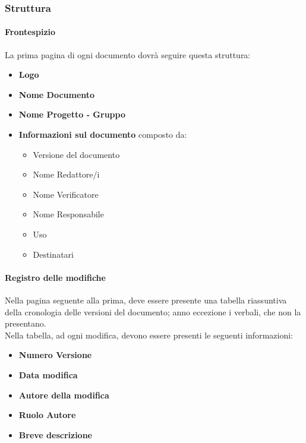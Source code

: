 \documentclass[11pt,a4paper]{article}
\begin{document}
{	\subsubsection{Struttura}
	
	\paragraph{Frontespizio\\} 
	La prima pagina di ogni documento dovrà seguire questa struttura:
	\begin{itemize}
		\item \textbf{Logo}
		\item \textbf{Nome Documento}
		\item \textbf{Nome Progetto - Gruppo}
		\item \textbf{Informazioni sul documento} composto da:
		\begin{itemize}
			\item  Versione del documento 
			\item Nome Redattore/i
			\item Nome Verificatore
			\item  Nome Responsabile
			\item  Uso
			\item Destinatari
		\end{itemize}
	\end{itemize}
	
	\paragraph{Registro delle modifiche\\}
	Nella pagina seguente alla prima, deve essere presente una tabella riassuntiva della cronologia delle versioni del documento; anno eccezione i verbali, che non la presentano. \\
	Nella tabella, ad ogni modifica, devono essere presenti le seguenti informazioni:
	
	\begin{itemize}
		\item \textbf{Numero Versione}
		\item \textbf{Data modifica}
		\item \textbf{Autore della modifica}
		\item \textbf{Ruolo Autore}
		\item \textbf{Breve descrizione}
	\end{itemize}
	
}
\end{document}
